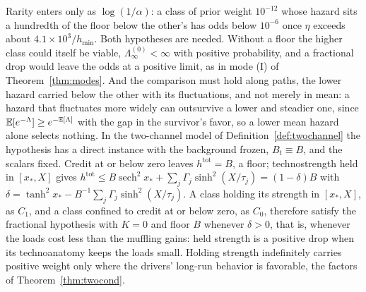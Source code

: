 \begin{remark}\label{rem:select}
Rarity enters only as $\log(1/\alpha)$: a class of prior weight
$10^{-12}$ whose hazard sits a hundredth of the floor below the other's
has odds below $10^{-6}$ once $\eta$ exceeds about $4.1\times10^{3}/h_{\min}$.
Both hypotheses are needed. Without a floor the higher class could
itself be viable, $\Lambda^{(0)}_\infty<\infty$ with positive
probability, and a fractional drop would leave the odds at a positive
limit, as in mode (I) of Theorem~\ref{thm:modes}. And the comparison
must hold along paths, the lower hazard carried below the other with its
fluctuations, and not merely in mean: a hazard that fluctuates more
widely can outsurvive a lower and steadier one, since
$\mathbb{E}[e^{-\Lambda}]\ge e^{-\mathbb{E}[\Lambda]}$ with the gap in the survivor's
favor, so a lower mean hazard alone selects nothing. In the two-channel
model of Definition~\ref{def:twochannel} the hypothesis has a direct
instance with the background frozen, $B_t\equiv B$, and the scalars fixed.
Credit at or below zero leaves $h^{\mathrm{tot}}=B$, a floor; technostrength
held in $[x_\ast,X]$ gives
$h^{\mathrm{tot}}\le B\operatorname{sech}^2x_\ast+\sum_j\Gamma_j\sinh^2(X/\tau_j)=(1-\delta)B$
with $\delta=\tanh^2x_\ast-B^{-1}\sum_j\Gamma_j\sinh^2(X/\tau_j)$. A class
holding its strength in $[x_\ast,X]$, as $C_1$, and a class confined to
credit at or below zero, as $C_0$, therefore satisfy the fractional
hypothesis with $K=0$ and floor $B$ whenever $\delta>0$, that is, whenever
the loads cost less than the muffling gains: held strength is a positive
drop when its technoanatomy keeps the loads small. Holding strength
indefinitely carries positive weight only where the drivers' long-run
behavior is favorable, the factors of Theorem~\ref{thm:twocond}.
\end{remark}


